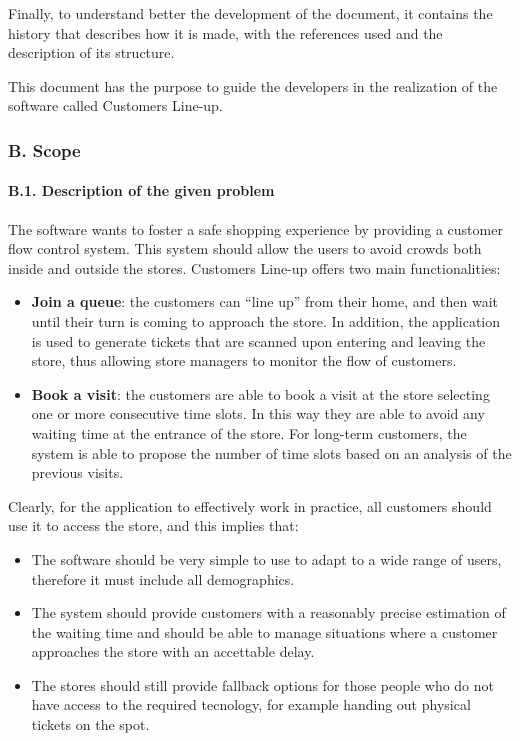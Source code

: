 \documentclass[
]{article}
\providecommand{\tightlist}{%
  \setlength{\itemsep}{0pt}\setlength{\parskip}{0pt}}
\begin{document}
Finally, to understand better the development of the document, it
contains the history that describes how it is made, with the references
used and the description of its structure.

This document has the purpose to guide the developers in the realization
of the software called Customers Line-up.

\hypertarget{b.-scope}{%
\subsubsection{B. Scope}\label{b.-scope}}

\hypertarget{b.1.-description-of-the-given-problem}{%
\paragraph{B.1. Description of the given
problem}\label{b.1.-description-of-the-given-problem}}

The software wants to foster a safe shopping experience by providing a
customer flow control system. This system should allow the users to
avoid crowds both inside and outside the stores. Customers Line-up
offers two main functionalities:

\begin{itemize}
\item
  \textbf{Join a queue}: the customers can ``line up'' from their home,
  and then wait until their turn is coming to approach the store. In
  addition, the application is used to generate tickets that are scanned
  upon entering and leaving the store, thus allowing store managers to
  monitor the flow of customers.
\item
  \textbf{Book a visit}: the customers are able to book a visit at the
  store selecting one or more consecutive time slots. In this way they
  are able to avoid any waiting time at the entrance of the store. For
  long-term customers, the system is able to propose the number of time
  slots based on an analysis of the previous visits.
\end{itemize}

Clearly, for the application to effectively work in practice, all
customers should use it to access the store, and this implies that:

\begin{itemize}
\tightlist
\item
  The software should be very simple to use to adapt to a wide range of
  users, therefore it must include all demographics.
\item
  The system should provide customers with a reasonably precise
  estimation of the waiting time and should be able to manage situations
  where a customer approaches the store with an accettable delay.
\item
  The stores should still provide fallback options for those people who
  do not have access to the required tecnology, for example handing out
  physical tickets on the spot.
\end{itemize}
\end{document}
